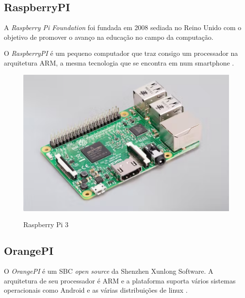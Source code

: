 \subsection{RaspberryPI}

A \textit{Raspberry Pi Foundation} foi fundada em 2008 sediada no Reino Unido com o objetivo de promover o avanço na educação no campo da computação. \cite{rasp}

O \textit{RaspberryPI} é um pequeno computador que traz consigo um processador na arquitetura ARM, a mesma tecnologia que se encontra em num smartphone \cite{rasp}.

\begin{figure}[!htbp]
  \caption{Raspberry Pi 3}
  \includegraphics[scale=0.4]{images/rasp.png}
  \label{figura:rasp}
\end{figure}

\subsection{OrangePI}

O \textit{OrangePI} é um SBC \textit{open source} da Shenzhen Xunlong Software. A arquitetura de seu processador é ARM e a plataforma suporta vários sistemas operacionais como Android e as várias distribuições de linux \cite{orangepi}.

